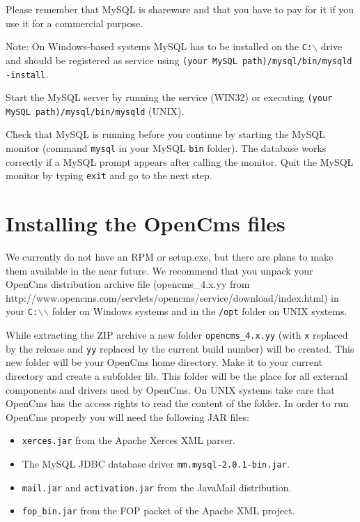 Please remember that MySQL 
is shareware and that you have to pay for it if you use it for a commercial purpose.

Note: On Windows-based systems MySQL has to be installed on the \texttt{C:$\backslash$} drive
and should be registered as service using \texttt{(your MySQL path)/mysql/bin/mysqld -install}.

Start the MySQL server by running the service (WIN32) or executing 
\texttt{(your MySQL path)/mysql/bin/mysqld} (UNIX).

Check that MySQL is running before you continue by starting the MySQL monitor 
(command \texttt{mysql} in your MySQL \texttt{bin} folder).
The database works correctly if a MySQL prompt appears after calling the monitor. 
Quit the MySQL monitor by typing \texttt{exit} and go to the next step. 

\section{Installing the OpenCms files}
We currently do not have an RPM or setup.exe, 
but there are plans to make them available in the near future.
We recommend that you unpack your OpenCms distribution archive file 
(opencms\_4.x.yy from \\
{http://www.opencms.com/servlets/opencms/service/download/index.html})
in your \texttt{C:$\backslash$$\backslash$} folder on Windows systems and 
in the \texttt{/opt} folder on UNIX systems. 

While extracting the ZIP archive
a new folder \texttt{opencms\_4.x.yy} (with \texttt{x} replaced by the release and \texttt{yy}
replaced by the current build number) will be created. This new folder will be your OpenCms home
directory. Make it to your current directory and create a subfolder lib.
This folder will be the place for all external components and drivers used by OpenCms. 
On UNIX systems take care that OpenCms has the access rights to read the content
of the folder. In order to run OpenCms properly
you will need the following JAR files:

\begin{itemize}
\item \texttt{xerces.jar} from the Apache Xerces XML parser. 
\item The MySQL JDBC database driver \texttt{mm.mysql-2.0.1-bin.jar}.
\item \texttt{mail.jar} and \texttt{activation.jar} from the JavaMail distribution.
\item \texttt{fop\_bin.jar} from the FOP packet of the Apache XML project.
\end{itemize}

